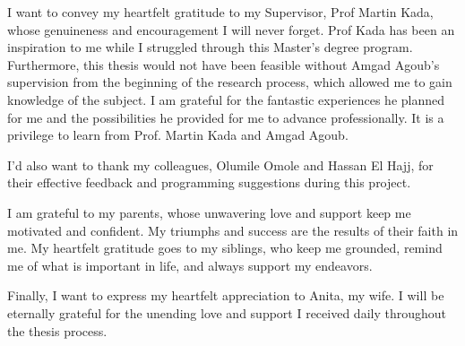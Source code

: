
I want to convey my heartfelt gratitude to my Supervisor, Prof Martin Kada, whose genuineness and encouragement I will never forget. Prof Kada has been an inspiration to me while I struggled through this Master's degree program. Furthermore, this thesis would not have been feasible without Amgad Agoub's supervision from the beginning of the research process, which allowed me to gain knowledge of the subject. I am grateful for the fantastic experiences he planned for me and the possibilities he provided for me to advance professionally. It is a privilege to learn from Prof. Martin Kada and Amgad Agoub.

I'd also want to thank my colleagues, Olumile Omole and Hassan El Hajj, for their effective feedback and programming suggestions during this project.

I am grateful to my parents, whose unwavering love and support keep me motivated and confident. My triumphs and success are the results of their faith in me. My heartfelt gratitude goes to my siblings, who keep me grounded, remind me of what is important in life, and always support my endeavors.

Finally, I want to express my heartfelt appreciation to Anita, my wife. I will be eternally grateful for the unending love and support I received daily throughout the thesis process.